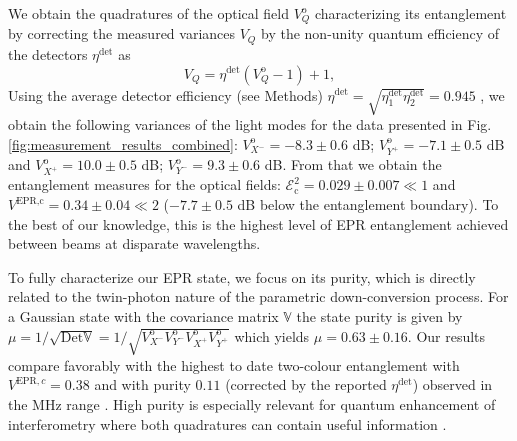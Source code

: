 \documentclass[final,twocolumn,english,prl,notitlepage,nofootinbib,floatfix,longbibliography,superscriptaddress
]{revtex4-2}
\begin{document}
We obtain the quadratures of the optical field $V_Q^\text{o}$ characterizing its entanglement by correcting the measured variances $V_Q$ by the non-unity quantum efficiency of the detectors  $\eta^\text{det}$ as
\begin{equation}
    V_Q =  \eta^{\text{det}}(V_Q^{\text{o}}-1)+1, 
\end{equation}
Using the average detector efficiency \cite{Schori2002} (see Methods) $\eta^\mathrm{det}=\sqrt{\eta_1^\mathrm{det}\eta_2^\mathrm{det}}=0.945$ , we obtain the following variances of the light modes for the data presented in Fig. \ref{fig:measurement_results_combined}: $V^ {\text{o}}_{X^-}= -8.3\pm0.6$ dB; $V^{\text{o}}_{Y^+} = -7.1\pm0.5$ dB and $V^{\text{o}}_{X^+}=10.0\pm0.5 $ dB; $V^{\text{o}}_{Y^-} = 9.3\pm0.6$ dB. From that we obtain the entanglement measures for the optical fields: $\mathcal{E}^{2}_{\text{c}}=0.029\pm 0.007 \ll 1$ and $V^{\text{EPR,c}}= 0.34\pm 0.04 \ll 2$ ($-7.7\pm0.5$ dB below the entanglement boundary). To the best of our knowledge, this is the highest level of EPR entanglement achieved between beams at disparate wavelengths. \par
To fully characterize our EPR state, we focus on its purity, which is directly related to the twin-photon nature of the parametric down-conversion process. For a Gaussian state with the covariance matrix $\mathbb{V}$ the state purity is given by $\mu=1/\sqrt{\text{Det} \mathbb{V}}=1/\sqrt{V^{\text{o}}_{X^-}V^{\text{o}}_{Y^-}V^{\text{o}}_{X^+}V^{\text{o}}_{Y^+}}$\cite{Adesso2014} which yields $\mu = 0.63 \pm0.16$.  Our results compare favorably with the highest  to date two-colour entanglement with $V^{\text{EPR},c}= 0.38 $ and with purity $0.11$ (corrected by the reported $\eta^{\text{det}}$) observed in the MHz range \cite{Wang2018a}. High purity is especially relevant for quantum enhancement of interferometry where both quadratures can contain useful information \cite{Yu2020,Steinlechner2013a}.\par
\end{document}
